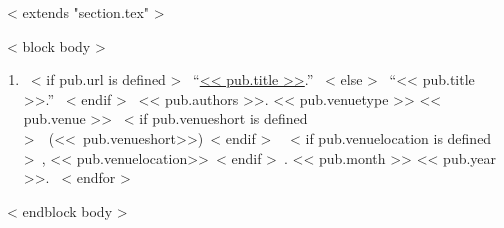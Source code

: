 ~< extends "section.tex" >~

~< block body >~
  \begin{enumerate}
    ~< for pub in items >~
      \item{
        ~< if pub.url is defined >~
          ``\href{<< pub.url >>}{<< pub.title >>}.''
        ~< else >~
          ``<< pub.title >>.''
        ~< endif >~
        << pub.authors >>.
        << pub.venuetype >>
        << pub.venue >>%
        ~< if pub.venueshort is defined >~\ \mbox{(<< pub.venueshort>>)}~< endif >~%
        ~< if pub.venuelocation is defined >~, << pub.venuelocation>>~< endif >~.
        << pub.month >>
        << pub.year >>.
      }
    ~< endfor >~
  \end{enumerate}
~< endblock body >~
